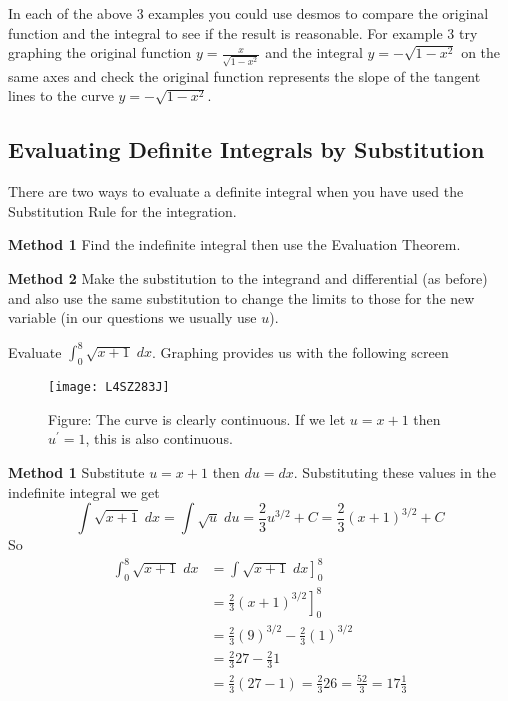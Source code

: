In each of the above 3 examples you could use desmos to compare the original function and the integral to
see if the result is reasonable. For example 3 try graphing the original function $y =\frac{x}{\sqrt{1 -x^{2}}}$ and the integral $y = -\sqrt{1 -x^{2}}$ on the same axes and check the original function represents the slope of the tangent lines to the curve $y = -\sqrt{1 -x^{2}}$. 

\subsection*{Evaluating Definite Integrals by Substitution}
There are two ways to evaluate a definite integral when you have used the Substitution Rule for the integration. 

\textbf{Method 1} Find the indefinite integral then use the Evaluation Theorem. 

\textbf{Method 2} Make the substitution to the integrand and differential (as before) and also use the same substitution to change the limits to those for the new variable (in our questions we usually use $u$). 

\example Evaluate $\int _{0}^{8}\sqrt{x +1}\; d x$. Graphing provides us with the following screen 
\begin{SCfigure}[1][h]
	\texttt{[image: L4SZ283J]}
	\caption*{Figure: The curve is clearly continuous. If we let $u =x +1$ then $u^{ \prime } =1$, this is also continuous.}
\end{SCfigure}

\solution
\textbf{Method 1} 
Substitute $u =x +1$ then $d u =d x$. Substituting these values in the indefinite integral we get
\begin{equation*}\int \sqrt{x +1}\; d x =\int \sqrt{u}\; d u =\frac{2}{3} u^{3/2} +C =\frac{2}{3} \left (x +1\right )^{3/2} +C
\end{equation*}So
\begin{align*}\int _{0}^{8}\sqrt{x +1}\; d x &  = \left .\int \sqrt{x +1}\; d x\right ]_{0}^{8} \\
 &  = \left .\frac{2}{3} \left (x +1\right )^{3/2}\right ]_{0}^{8} \\
 &  = \frac{2}{3} \left (9\right )^{3/2} -\frac{2}{3} \left (1\right )^{3/2} \\
 &  = \frac{2}{3} 27 -\frac{2}{3} 1 \\
 &  = \frac{2}{3} \left (27 -1\right ) =\frac{2}{3} 26 =\frac{52}{3} =17\frac{1}{3}\end{align*}

